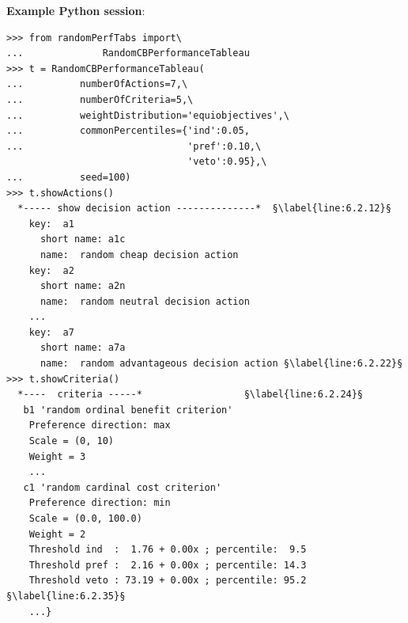 \noindent \textbf{Example Python session}:
\begin{lstlisting}[caption={Generating a random Cost-Benefit performance tableau},label=list:6.2]
>>> from randomPerfTabs import\
...              RandomCBPerformanceTableau
>>> t = RandomCBPerformanceTableau(
...          numberOfActions=7,\
...          numberOfCriteria=5,\
...          weightDistribution='equiobjectives',\
...          commonPercentiles={'ind':0.05,
...                             'pref':0.10,\
                                'veto':0.95},\
...          seed=100)
>>> t.showActions()
  *----- show decision action --------------*  §\label{line:6.2.12}§
    key:  a1
      short name: a1c
      name:  random cheap decision action
    key:  a2
      short name: a2n
      name:  random neutral decision action
    ...
    key:  a7
      short name: a7a
      name:  random advantageous decision action §\label{line:6.2.22}§
>>> t.showCriteria()
  *----  criteria -----*                  §\label{line:6.2.24}§
   b1 'random ordinal benefit criterion' 
    Preference direction: max
    Scale = (0, 10)
    Weight = 3
    ...
   c1 'random cardinal cost criterion'
    Preference direction: min
    Scale = (0.0, 100.0)
    Weight = 2 
    Threshold ind  :  1.76 + 0.00x ; percentile:  9.5
    Threshold pref :  2.16 + 0.00x ; percentile: 14.3
    Threshold veto : 73.19 + 0.00x ; percentile: 95.2  §\label{line:6.2.35}§
    ...}
\end{lstlisting}

